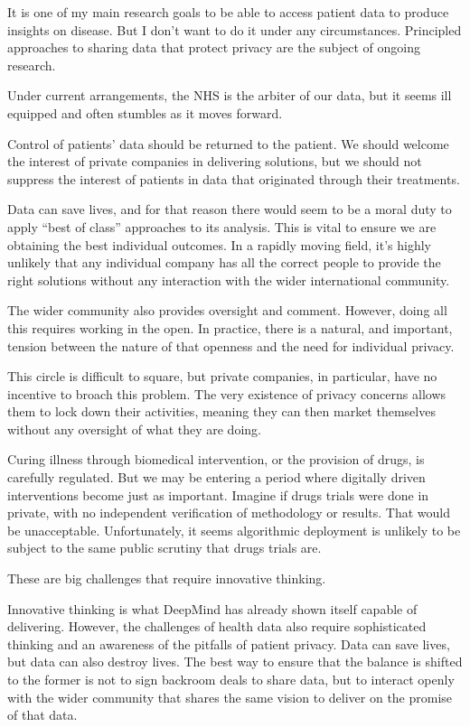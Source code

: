 \documentclass[a4paper]{caesar_book}
\begin{document}
It is one of my main research goals to be able to access patient data to produce insights on disease. But I don’t want to do it under any circumstances. Principled approaches to sharing data that protect privacy are the subject of ongoing research.

Under current arrangements, the NHS is the arbiter of our data, but it seems ill equipped and often stumbles as it moves forward.

Control of patients’ data should be returned to the patient. We should welcome the interest of private companies in delivering solutions, but we should not suppress the interest of patients in data that originated through their treatments.

Data can save lives, and for that reason there would seem to be a moral duty to apply “best of class” approaches to its analysis. This is vital to ensure we are obtaining the best individual outcomes. In a rapidly moving field, it’s highly unlikely that any individual company has all the correct people to provide the right solutions without any interaction with the wider international community.

The wider community also provides oversight and comment. However, doing all this requires working in the open. In practice, there is a natural, and important, tension between the nature of that openness and the need for individual privacy.

This circle is difficult to square, but private companies, in particular, have no incentive to broach this problem. The very existence of privacy concerns allows them to lock down their activities, meaning they can then market themselves without any oversight of what they are doing.

Curing illness through biomedical intervention, or the provision of drugs, is carefully regulated. But we may be entering a period where digitally driven interventions become just as important. Imagine if drugs trials were done in private, with no independent verification of methodology or results. That would be unacceptable. Unfortunately, it seems algorithmic deployment is unlikely to be subject to the same public scrutiny that drugs trials are.

These are big challenges that require innovative thinking.

Innovative thinking is what DeepMind has already shown itself capable of delivering. However, the challenges of health data also require sophisticated thinking and an awareness of the pitfalls of patient privacy. Data can save lives, but data can also destroy lives. The best way to ensure that the balance is shifted to the former is not to sign backroom deals to share data, but to interact openly with the wider community that shares the same vision to deliver on the promise of that data.
\end{document}
